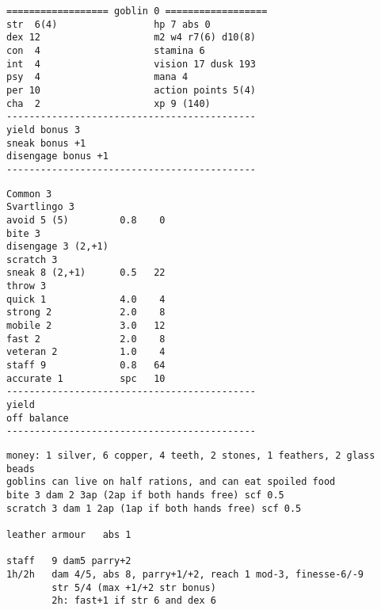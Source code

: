 \begin{verbatim}
================== goblin 0 ==================
str  6(4)                 hp 7 abs 0
dex 12                    m2 w4 r7(6) d10(8)
con  4                    stamina 6
int  4                    vision 17 dusk 193
psy  4                    mana 4
per 10                    action points 5(4)
cha  2                    xp 9 (140)
--------------------------------------------
yield bonus 3
sneak bonus +1
disengage bonus +1
--------------------------------------------
\end{verbatim} \goodbreak \begin{verbatim}
Common 3
Svartlingo 3
avoid 5 (5)         0.8    0
bite 3
disengage 3 (2,+1)
scratch 3
sneak 8 (2,+1)      0.5   22
throw 3
quick 1             4.0    4
strong 2            2.0    8
mobile 2            3.0   12
fast 2              2.0    8
veteran 2           1.0    4
staff 9             0.8   64
accurate 1          spc   10
--------------------------------------------
yield
off balance
--------------------------------------------
\end{verbatim} \goodbreak \begin{verbatim}
money: 1 silver, 6 copper, 4 teeth, 2 stones, 1 feathers, 2 glass beads
goblins can live on half rations, and can eat spoiled food
bite 3 dam 2 3ap (2ap if both hands free) scf 0.5
scratch 3 dam 1 2ap (1ap if both hands free) scf 0.5

leather armour   abs 1

staff   9 dam5 parry+2
1h/2h   dam 4/5, abs 8, parry+1/+2, reach 1 mod-3, finesse-6/-9
        str 5/4 (max +1/+2 str bonus)
        2h: fast+1 if str 6 and dex 6

\end{verbatim}
\normalsize



























\newpage
